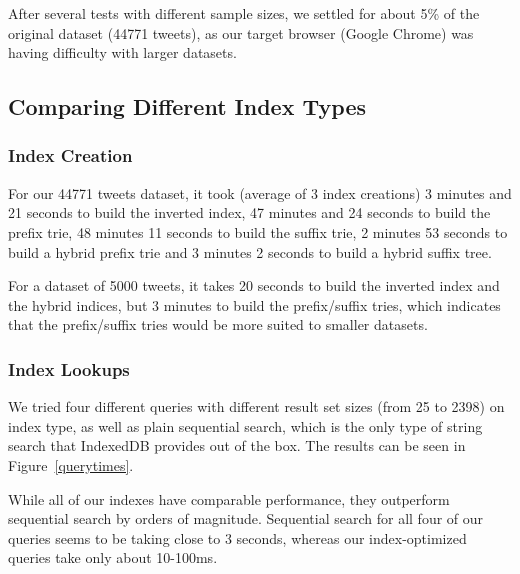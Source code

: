 \documentclass{vldb}
\begin{document}
After several tests with different sample sizes, we settled for about 5\% of the original dataset (44771 tweets), as our target browser (Google Chrome) was having difficulty with larger datasets.

\subsection{Comparing Different Index Types}

\subsubsection{Index Creation}

For our 44771 tweets dataset, it took (average of 3 index creations) 3 minutes and 21 seconds to build the inverted index, 47 minutes and 24 seconds to build the prefix trie, 48 minutes 11 seconds to build the suffix trie, 2 minutes 53 seconds to build a hybrid prefix trie and 3 minutes 2 seconds to build a hybrid suffix tree.

For a dataset of 5000 tweets, it takes 20 seconds to build the inverted index and the hybrid indices, but 3 minutes to build the prefix/suffix tries, which indicates that the prefix/suffix tries would be more suited to smaller datasets.

\subsubsection{Index Lookups}

We tried four different queries with different result set sizes (from 25 to 2398) on index type, as well as plain sequential search, which is the only type of string search that IndexedDB provides out of the box. The results can be seen in Figure~\ref{querytimes}.

While all of our indexes have comparable performance, they outperform sequential search by orders of magnitude. Sequential search for all four of our queries seems to be taking close to 3 seconds, whereas our index-optimized queries take only about 10-100ms. 
\end{document}
